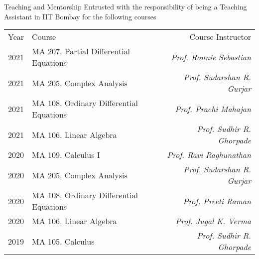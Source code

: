 
\begin{rubric}{Teaching and Mentorship}
	\entry*[2019-2021] Entrusted with the responsibility of being a Teaching Assistant in IIT Bombay for the following courses 

	\begin{tabular}{@{}llr}
		Year & Course & Course Instructor\\
		2021 & MA 207, Partial Differential Equations & \emph{Prof. Ronnie Sebastian}\\
		2021 & MA 205, Complex Analysis & \emph{Prof. Sudarshan R. Gurjar}\\
		2021 & MA 108, Ordinary Differential Equations & \emph{Prof. Prachi Mahajan}\\
		2021 & MA 106, Linear Algebra & \emph{Prof. Sudhir R. Ghorpade}\\
		2020 & MA 109, Calculus I & \emph{Prof. Ravi Raghunathan}\\
		2020 & MA 205, Complex Analysis & \emph{Prof. Sudarshan R. Gurjar}\\
		2020 & MA 108, Ordinary Differential Equations & \emph{Prof. Preeti Raman}\\
		2020 & MA 106, Linear Algebra & \emph{Prof. Jugal K. Verma}\\
       	2019 & MA 105, Calculus & \hphantom{hello}\emph{Prof. Sudhir R. Ghorpade}
    \end{tabular}


\end{rubric}
